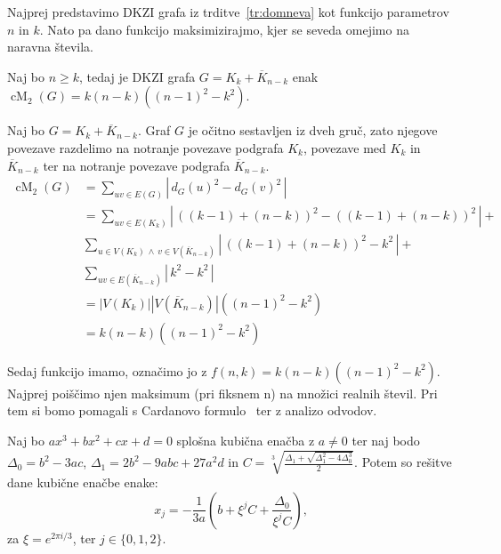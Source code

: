 \documentclass[fin1, tisk]{fmfdelo}
\newcommand{\KC}{\overline{K}}
\newcommand{\cM}{\operatorname{cM}_2}
\begin{document}
Najprej predstavimo DKZI grafa iz trditve~\ref{tr:domneva} 
kot funkcijo parametrov $n$ in $k$. Nato pa dano funkcijo maksimizirajmo, kjer se seveda 
omejimo na naravna števila.

\begin{trditev}\label{tr:fnk}
Naj bo $n \geq k$, tedaj je DKZI 
grafa $G = K_k + \KC_{n-k}$ enak $\cM(G) = k (n-k) ((n-1)^2 - k^2)$.
\end{trditev}

\begin{dokaz}
Naj bo  $G = K_k + \KC_{n-k}$. Graf $G$ je očitno sestavljen iz dveh gruč,
zato njegove povezave razdelimo na notranje povezave 
podgrafa $K_k$, povezave med $K_k$ in 
$\KC_{n-k}$ ter na notranje povezave podgrafa $\KC_{n-k}$.
\begin{align*}
  \cM(G) &= \sum_{uv \in E(G)} |\,d_G(u)^2 - d_G(v)^2\,| \\
  &= \sum_{uv \in E(K_k)} |\,((k-1) + (n-k))^2 - ((k-1) + (n-k))^2\,| + \\
    &\sum_{u \in V(K_k)\, \land \,v \in V(\KC_{n-k})}|\,((k-1)+(n-k))^2 - k^2\,| + \\
    &\sum_{uv \in E(\KC_{n-k})} |\,k^2 - k^2\,| \\
  &= |V(K_k)| |V(\KC_{n-k})| ((n-1)^2 - k^2) \\
  &= k (n-k) ((n-1)^2 - k^2)
\end{align*} 
\end{dokaz}

Sedaj funkcijo imamo, označimo jo z $f(n, k) = k (n-k) ((n-1)^2 - k^2)$.
Najprej poiščimo njen maksimum (pri fiksnem n) na množici realnih števil. 
Pri tem si bomo pomagali s Cardanovo formulo~\cite{cardano} ter z analizo 
odvodov.

\begin{izrek}\label{iz:cardano}
Naj bo $ax^3 + bx^2 + cx + d = 0$ splošna kubična enačba z $a \neq 0$ ter 
naj bodo $\Delta_0 = b^2 - 3ac$, $\Delta_1 = 2b^2 - 9abc + 27a^2d$ in 
$C = \sqrt[3]{\frac{\Delta_1 + \sqrt{\Delta_1^2 - 4 \Delta_0^3}}{2}}$. 
Potem so rešitve dane kubične enačbe enake:
\begin{equation}
  x_j = -\frac{1}{3a}\left(b + \xi^j C + \frac{\Delta_0}{\xi^j C}\right),
\end{equation}
za $\xi = e^{2\pi i/3}$, ter $j \in \{0, 1, 2\}$.
\end{izrek}
\end{document}
